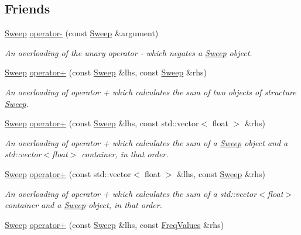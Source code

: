\subsection*{Friends}
\begin{DoxyCompactItemize}
\item 
\hyperlink{structSweep}{Sweep} \hyperlink{structSweep_a29420e86f220ed305794c8e560059bbc}{operator-\/} (const \hyperlink{structSweep}{Sweep} \&argument)
\begin{DoxyCompactList}\small\item\em An overloading of the unary operator -\/ which negates a {\itshape \hyperlink{structSweep}{Sweep}} object. \end{DoxyCompactList}\item 
\hyperlink{structSweep}{Sweep} \hyperlink{structSweep_a96391241f10ea728ee36b62f6c35d604}{operator+} (const \hyperlink{structSweep}{Sweep} \&lhs, const \hyperlink{structSweep}{Sweep} \&rhs)
\begin{DoxyCompactList}\small\item\em An overloading of operator + which calculates the sum of two objects of structure {\itshape \hyperlink{structSweep}{Sweep}}. \end{DoxyCompactList}\item 
\hyperlink{structSweep}{Sweep} \hyperlink{structSweep_ab372b814f572937b3f0cef31752994b9}{operator+} (const \hyperlink{structSweep}{Sweep} \&lhs, const std\+::vector$<$ float $>$ \&rhs)
\begin{DoxyCompactList}\small\item\em An overloading of operator + which calculates the sum of a {\itshape \hyperlink{structSweep}{Sweep}} object and a {\ttfamily std\+::vector$<$float$>$} container, in that order. \end{DoxyCompactList}\item 
\hyperlink{structSweep}{Sweep} \hyperlink{structSweep_a770d2ac63866693c821c99cbfe2b2c9a}{operator+} (const std\+::vector$<$ float $>$ \&lhs, const \hyperlink{structSweep}{Sweep} \&rhs)
\begin{DoxyCompactList}\small\item\em An overloading of operator + which calculates the sum of a {\ttfamily std\+::vector$<$float$>$} container and a {\itshape \hyperlink{structSweep}{Sweep}} object, in that order. \end{DoxyCompactList}\item 
\hyperlink{structSweep}{Sweep} \hyperlink{structSweep_a5d6fad874c778ae77a10b57446a0bd93}{operator+} (const \hyperlink{structSweep}{Sweep} \&lhs, const \hyperlink{structFreqValues}{Freq\+Values} \&rhs)

\end{DoxyCompactItemize}

